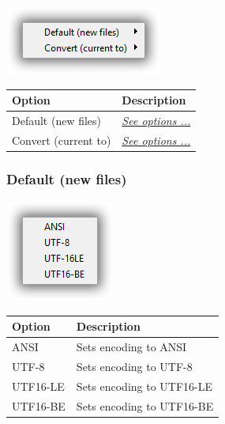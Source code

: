 \includegraphics[scale=0.50]{./res/menu_format_encoding.png}\\

\begin{scriptsize}
  \begin{tabularx}{\textwidth}{>{\hsize=0.4\hsize}X>{\hsize=0.6\hsize}X}\\
    \hline
    \textbf{Option} & \textbf{Description} \\
    \hline
    Default (new files) & \textit{\href{\#menu\_format\_encoding\_default}{See options ...}} \\
    Convert (current to) & \textit{\href{\#menu\_format\_encoding\_convert}{See options ...}} \\
    \hline
  \end{tabularx}
\end{scriptsize}


\hypertarget{menu_format_encoding_default}{}
\subsubsection{Default (new files)}

\includegraphics[scale=0.50]{./res/encoding.png}\\

\begin{scriptsize}
  \begin{tabularx}{\textwidth}{>{\hsize=0.3\hsize}X>{\hsize=0.7\hsize}X}\\
    \hline
    \textbf{Option} & \textbf{Description} \\
    \hline
    ANSI & Sets encoding to ANSI \\
    UTF-8 & Sets encoding to UTF-8 \\
    UTF16-LE & Sets encoding to UTF16-LE \\
    UTF16-BE & Sets encoding to UTF16-BE \\
    \hline
  \end{tabularx}
\end{scriptsize}


